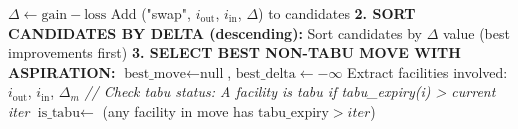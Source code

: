 \documentclass[11pt,a4paper]{article}
\begin{document}
\begin{algorithm}[H]
\begin{algorithmic}[1]
            \State \hspace{2.5cm} 
            \State $\Delta \leftarrow \text{gain} - \text{loss}$ 
            \State Add ("swap", $i_{\text{out}}$, $i_{\text{in}}$, $\Delta$) to candidates
        \EndIf
    \EndFor
    \State
    \State \textbf{2. SORT CANDIDATES BY DELTA (descending):}
    \State Sort candidates by $\Delta$ value (best improvements first)
    \State
    \State \textbf{3. SELECT BEST NON-TABU MOVE WITH ASPIRATION:}
    \State $\text{best\_move} \leftarrow \text{null}$, $\text{best\_delta} \leftarrow -\infty$
        \State Extract facilities involved: $i_{\text{out}}$, $i_{\text{in}}$, $\Delta_m$
        \State
        \State \textit{// Check tabu status: A facility is tabu if tabu\_expiry(i) > current iter}
        \State $\text{is\_tabu} \leftarrow$ (any facility in move has $\text{tabu\_expiry} > iter$)

\end{algorithmic}
\end{algorithm}
\end{document}
